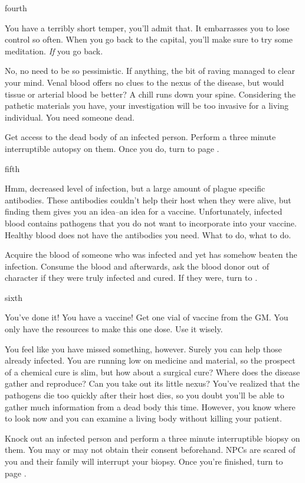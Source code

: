 \documentclass[greennotebook]{Pestilence} %
\begin{document}
\begin{page}{fourth}

You have a terribly short temper, you'll admit that. It embarrasses you to lose control so often. When you go back to the capital, you'll make sure to try some meditation. \textit{If} you go back.

No, no need to be so pessimistic. If anything, the bit of raving managed to clear your mind. Venal blood offers no clues to the nexus of the disease, but would tissue or arterial blood be better? A chill runs down your spine. Considering the pathetic materials you have, your investigation will be too invasive for a living individual. You need someone dead.

Get access to the dead body of an infected person. Perform a three minute interruptible autopsy on them. Once you do, turn to page .

\end{page}

\begin{page}{fifth}

Hmm, decreased level of infection, but a large amount of plague specific antibodies. These antibodies couldn't help their host when they were alive, but finding them gives you an idea--an idea for a vaccine. Unfortunately, infected blood contains pathogens that you do not want to incorporate into your vaccine. Healthy blood does not have the antibodies you need. What to do, what to do.

Acquire the blood of someone who was infected and yet has somehow beaten the infection. Consume the blood and afterwards, ask the blood donor out of character if they were truly infected and cured. If they were, turn to .

\end{page}

\begin{page}{sixth}

You've done it! You have a vaccine! Get one vial of vaccine from the GM. You only have the resources to make this one dose. Use it wisely.

You feel like you have missed something, however. Surely you can help those already infected. You are running low on medicine and material, so the prospect of a chemical cure is slim, but how about a surgical cure? Where does the disease gather and reproduce? Can you take out its little nexus? You've realized that the pathogens die too quickly after their host dies, so you doubt you'll be able to gather much information from a dead body this time. However, you know where to look now and you can examine a living body without killing your patient.

Knock out an infected person and perform a three minute interruptible biopsy on them. You may or may not obtain their consent beforehand. NPCs are scared of you and their family will interrupt your biopsy. Once you're finished, turn to page .

\end{page}
\end{document}
